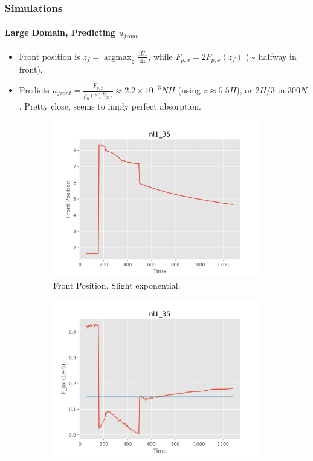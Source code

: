 \documentclass[dvipsnames, 10pt]{beamer}
\newcommand*{\scinot}[2]{#1\times10^{#2}}
\newcommand*{\rd}[2]{\frac{\mathrm{d}#1}{\mathrm{d}#2}}
\DeclareMathOperator*{\argmax}{argmax}
\begin{document}
\begin{frame}
    \frametitle{Simulations}
    \framesubtitle{Large Domain, Predicting $u_{front}$}

    \begin{itemize}
        \item Front position is $z_f = \argmax_z \rd{\bar{U}_x}{z}$, while
            $F_{p, x} = 2F_{p, x}(z_f)$ ($\sim$ halfway in front).

        \item Predicts $u_{front} = \frac{F_{p, x}}{\rho_0(z) \bar{U}_{x, c}}
            \approx \scinot{2.2}{-3}NH$ (using $z \approx 5.5H$), or $2H/3$ in
            $300N$. Pretty close, seems to imply perfect absorption.
    \end{itemize}
    \begin{figure}[t]
        \centering
        \hspace*{-19mm}%
        \begin{subfigure}{0.53\textwidth}
            \centering
            \includegraphics[width=\textwidth]{front_nl.png}
            \caption{Front Position. Slight exponential.}
        \end{subfigure}
        \begin{subfigure}{0.53\textwidth}
            \centering
            \includegraphics[width=\textwidth]{fluxes_nl.png}

\end{subfigure}
\end{figure}
\end{frame}
\end{document}
